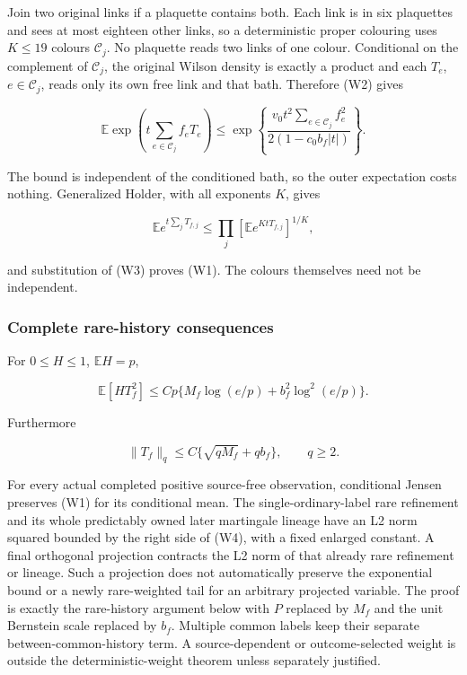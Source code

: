 \documentclass[
  11pt,
]{article}
\begin{document}
Join two original links if a plaquette contains both. Each link is in
six plaquettes and sees at most eighteen other links, so a deterministic
proper colouring uses \(K\le19\) colours \(\mathcal C_j\). No plaquette
reads two links of one colour. Conditional on the complement of
\(\mathcal C_j\), the original Wilson density is exactly a product and
each \(T_e\), \(e\in\mathcal C_j\), reads only its own free link and
that bath. Therefore (W2) gives

\[
 \mathbb E\exp\left(t\sum_{e\in\mathcal C_j}f_eT_e\right)
 \le\exp\left\{\frac{v_0t^2\sum_{e\in\mathcal C_j}f_e^2}{2(1-c_0b_f|t|)}\right\}. \tag{W3}
\]

The bound is independent of the conditioned bath, so the outer
expectation costs nothing. Generalized Holder, with all exponents \(K\),
gives

\[
 \mathbb E e^{t\sum_jT_{f,j}}
 \le\prod_j[\mathbb E e^{KtT_{f,j}}]^{1/K},
\]

and substitution of (W3) proves (W1). The colours themselves need not be
independent.

\hypertarget{complete-rare-history-consequences}{%
\subsubsection{Complete rare-history
consequences}\label{complete-rare-history-consequences}}

For \(0\le H\le1\), \(\mathbb EH=p\),

\[
 \boxed{\quad
 \mathbb E[H T_f^2]
 \le Cp\{M_f\log(e/p)+b_f^2\log^2(e/p)\}.
 \quad} \tag{W4}
\]

Furthermore

\[
 \|T_f\|_q\le C\{\sqrt{qM_f}+qb_f\},\qquad q\ge2. \tag{W5}
\]

For every actual completed positive source-free observation, conditional
Jensen preserves (W1) for its conditional mean. The
single-ordinary-label rare refinement and its whole predictably owned
later martingale lineage have an L2 norm squared bounded by the right
side of (W4), with a fixed enlarged constant. A final orthogonal
projection contracts the L2 norm of that already rare refinement or
lineage. Such a projection does not automatically preserve the
exponential bound or a newly rare-weighted tail for an arbitrary
projected variable. The proof is exactly the rare-history argument below
with \(P\) replaced by \(M_f\) and the unit Bernstein scale replaced by
\(b_f\). Multiple common labels keep their separate
between-common-history term. A source-dependent or outcome-selected
weight is outside the deterministic-weight theorem unless separately
justified.
\end{document}
